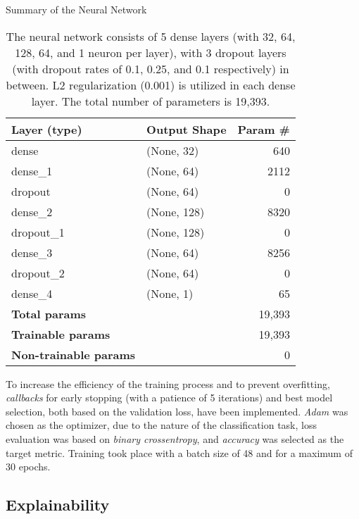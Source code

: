 \begin{table}[h]
    \centering
    \caption{Summary of the Neural Network}
    \begin{tabularx}{\textwidth}{lXr}
    \hline
    \textbf{Layer (type)} & \textbf{Output Shape} & \textbf{Param \#} \\
    \hline
    dense & (None, 32) & 640 \\
    dense\_1 & (None, 64) & 2112 \\
    dropout & (None, 64) & 0 \\
    dense\_2 & (None, 128) & 8320 \\
    dropout\_1 & (None, 128) & 0 \\
    dense\_3 & (None, 64) & 8256 \\
    dropout\_2 & (None, 64) & 0 \\
    dense\_4 & (None, 1) & 65 \\
    \hline
    \textbf{Total params} & & 19,393 \\
    \textbf{Trainable params} & & 19,393 \\
    \textbf{Non-trainable params} & & 0 \\
    \hline
    \end{tabularx}
    \caption*{The neural network consists of 5 dense layers (with 32, 64, 128, 64, and 1 neuron per layer), with 3 dropout layers (with dropout rates of 0.1, 0.25, and 0.1 respectively) in between. L2 regularization (0.001) is utilized in each dense layer. The total number of parameters is 19,393.}
    \label{tab:CH03_Model_Details}
\end{table}

To increase the efficiency of the training process and to prevent overfitting, \textit{callbacks} for early stopping (with a patience of 5 iterations) and best model selection, both based on the validation loss, have been implemented. 
\textit{Adam} was chosen as the optimizer, due to the nature of the classification task, loss evaluation was based on \textit{binary crossentropy}, and \textit{accuracy} was selected as the target metric. Training took place with a batch size of 48 and for a maximum of 30 epochs. 

\subsection{Explainability}\label{subsec:Explainability}

